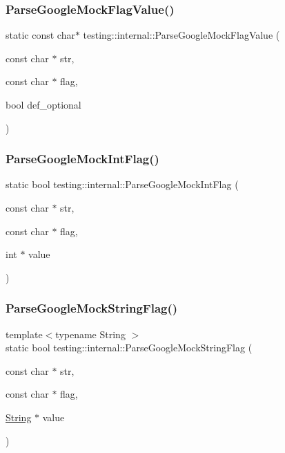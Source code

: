 \subsubsection{\texorpdfstring{ParseGoogleMockFlagValue()}{ParseGoogleMockFlagValue()}}
{\footnotesize\ttfamily static const char$\ast$ testing\+::internal\+::\+Parse\+Google\+Mock\+Flag\+Value (\begin{DoxyParamCaption}\item[{const char $\ast$}]{str,  }\item[{const char $\ast$}]{flag,  }\item[{bool}]{def\+\_\+optional }\end{DoxyParamCaption})\hspace{0.3cm}{\ttfamily [static]}}

\mbox{\label{namespacetesting_1_1internal_a5d201d5b16143a31fa16dc23b5d4af80}} 
\subsubsection{\texorpdfstring{ParseGoogleMockIntFlag()}{ParseGoogleMockIntFlag()}}
{\footnotesize\ttfamily static bool testing\+::internal\+::\+Parse\+Google\+Mock\+Int\+Flag (\begin{DoxyParamCaption}\item[{const char $\ast$}]{str,  }\item[{const char $\ast$}]{flag,  }\item[{int $\ast$}]{value }\end{DoxyParamCaption})\hspace{0.3cm}{\ttfamily [static]}}

\mbox{\label{namespacetesting_1_1internal_afb359266feb817d9943854b76574817d}} 
\subsubsection{\texorpdfstring{ParseGoogleMockStringFlag()}{ParseGoogleMockStringFlag()}}
{\footnotesize\ttfamily template$<$typename String $>$ \\
static bool testing\+::internal\+::\+Parse\+Google\+Mock\+String\+Flag (\begin{DoxyParamCaption}\item[{const char $\ast$}]{str,  }\item[{const char $\ast$}]{flag,  }\item[{\mbox{\hyperlink{classtesting_1_1internal_1_1String}{String}} $\ast$}]{value }\end{DoxyParamCaption})\hspace{0.3cm}{\ttfamily [static]}}


